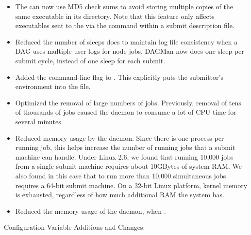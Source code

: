 \begin{itemize}

\item The  can now use MD5 check sums to avoid storing
multiple copies of the same executable in its  directory.
Note that this feature only affects executables sent to the
 via the  command within
a submit description file.

\item Reduced the number of sleeps  does to maintain log
file consistency when a DAG uses multiple user logs for node jobs.
DAGMan now does one sleep per submit cycle,
instead of one sleep for each submit.

\item Added the  command-line flag to
.  This explicitly puts the submittor's environment
into the  file.

\item Optimized the removal of large numbers of jobs.  
Previously, removal of tens of thousands of jobs caused the
 daemon to consume
a lot of CPU time for several minutes.

\item Reduced memory usage by the  daemon.  Since there is one
 process per running job, this helps increase the
number of running jobs that a submit machine can handle.  Under Linux 2.6,
we found that running 10,000 jobs from a single submit machine
requires about 10GBytes of system RAM.  We also found in this case that to
run more than 10,000 simultaneous jobs requires a 64-bit submit
machine.  On a 32-bit Linux platform, kernel memory is exhausted,
regardless of how much additional RAM the system has.

\item Reduced the memory usage of the  daemon,
when .

\end{itemize}

\noindent Configuration Variable Additions and Changes:

